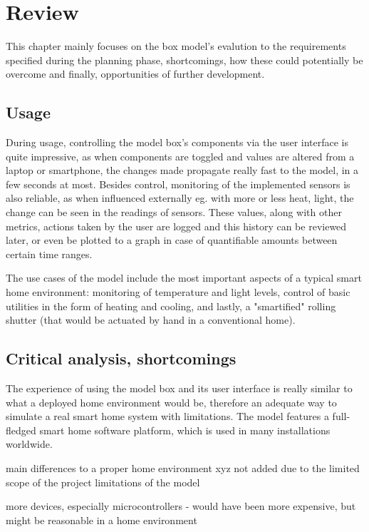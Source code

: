 \chapter{Review}

This chapter mainly focuses on the box model's evalution to the requirements specified during the planning phase, shortcomings, how these could potentially be overcome and finally, opportunities of further development.

\section{Usage}

During usage, controlling the model box's components via the user interface is quite impressive, as when components are toggled and values are altered from a laptop or smartphone, the changes made propagate really fast to the model, in a few seconds at most. Besides control, monitoring of the implemented sensors is also reliable, as when influenced externally eg. with more or less heat, light, the change can be seen in the readings of sensors. These values, along with other metrics, actions taken by the user are logged and this history can be reviewed later, or even be plotted to a graph in case of quantifiable amounts between certain time ranges.


The use cases of the model include the most important aspects of a typical smart home environment: monitoring of temperature and light levels, control of basic utilities in the form of heating and cooling, and lastly, a "smartified" rolling shutter (that would be actuated by hand in a conventional home).

\section{Critical analysis, shortcomings}

The experience of using the model box and its user interface is really similar to what a deployed home environment would be, therefore an adequate way to simulate a real smart home system with limitations. The model features a full-fledged smart home software platform, which is used in many installations worldwide. 

main differences to a proper home environment
xyz not added due to the limited scope of the project
limitations of the model

more devices, especially microcontrollers - would have been more expensive, but might be reasonable in a home environment

